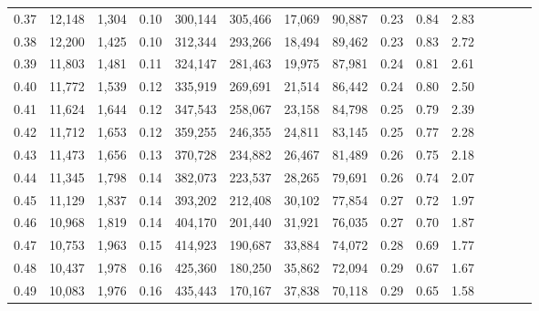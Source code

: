 \begin{tabular}{rrrcrrrrrrrrrrr}
0.37 &  12,148 &  1,304 &                                       0.10 &  300,144 &  305,466 &   17,069 &   90,887 &  0.23 &  0.84 &                         2.83 \\
0.38 &  12,200 &  1,425 &                                       0.10 &  312,344 &  293,266 &   18,494 &   89,462 &  0.23 &  0.83 &                         2.72 \\
0.39 &  11,803 &  1,481 &                                       0.11 &  324,147 &  281,463 &   19,975 &   87,981 &  0.24 &  0.81 &                         2.61 \\
0.40 &  11,772 &  1,539 &                                       0.12 &  335,919 &  269,691 &   21,514 &   86,442 &  0.24 &  0.80 &                         2.50 \\
0.41 &  11,624 &  1,644 &                                       0.12 &  347,543 &  258,067 &   23,158 &   84,798 &  0.25 &  0.79 &                         2.39 \\
0.42 &  11,712 &  1,653 &                                       0.12 &  359,255 &  246,355 &   24,811 &   83,145 &  0.25 &  0.77 &                         2.28 \\
0.43 &  11,473 &  1,656 &                                       0.13 &  370,728 &  234,882 &   26,467 &   81,489 &  0.26 &  0.75 &                         2.18 \\
0.44 &  11,345 &  1,798 &                                       0.14 &  382,073 &  223,537 &   28,265 &   79,691 &  0.26 &  0.74 &                         2.07 \\
0.45 &  11,129 &  1,837 &                                       0.14 &  393,202 &  212,408 &   30,102 &   77,854 &  0.27 &  0.72 &                         1.97 \\
0.46 &  10,968 &  1,819 &                                       0.14 &  404,170 &  201,440 &   31,921 &   76,035 &  0.27 &  0.70 &                         1.87 \\
0.47 &  10,753 &  1,963 &                                       0.15 &  414,923 &  190,687 &   33,884 &   74,072 &  0.28 &  0.69 &                         1.77 \\
0.48 &  10,437 &  1,978 &                                       0.16 &  425,360 &  180,250 &   35,862 &   72,094 &  0.29 &  0.67 &                         1.67 \\
0.49 &  10,083 &  1,976 &                                       0.16 &  435,443 &  170,167 &   37,838 &   70,118 &  0.29 &  0.65 &                         1.58 \\

\end{tabular}
